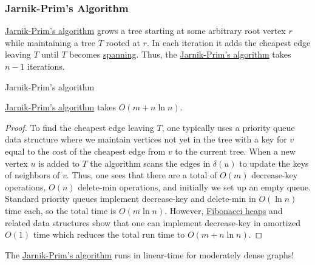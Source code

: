 \subsubsection{Jarnik-Prim's Algorithm}
\hyperref[algo:Jarnik-Prim]{Jarnik-Prim's algorithm} grows a tree starting at some arbitrary root vertex \(r\) while maintaining a tree \(T\) rooted at \(r\). In each iteration it adds the cheapest edge leaving \(T\) until \(T\) becomes \hyperref[def:spanning-tree]{spanning}. Thus, the \hyperref[algo:Jarnik-Prim]{Jarnik-Prim's algorithm} takes \(n-1\) iterations.

\begin{algorithm}[H]\label{algo:Jarnik-Prim}
	\DontPrintSemicolon
	\caption{Jarnik-Prim's algorithm}
	\BlankLine

\end{algorithm}

\begin{lemma}\label{lma:Jarnik-Prim}
	\hyperref[algo:Jarnik-Prim]{Jarnik-Prim's algorithm} takes \(O(m + n \ln n)\).
\end{lemma}
\begin{proof}
	To find the cheapest edge leaving \(T\), one typically uses a priority queue data structure where we maintain vertices not yet in the tree with a key for \(v\) equal to the cost of the cheapest edge from \(v\) to the current tree. When a new vertex \(u\) is added to \(T\) the algorithm scans the edges in \(\delta (u)\) to update the keys of neighbors of \(v\). Thus, one sees that there are a total of \(O(m)\) decrease-key operations, \(O(n)\) delete-min operations, and initially we set up an empty queue. Standard priority queues implement decrease-key and delete-min in \(O(\ln n)\) time each, so the total time is \(O(m \ln n)\). However, \href{https://en.wikipedia.org/wiki/Fibonacci_heap}{Fibonacci heaps} and related data structures show that one can implement decrease-key in amortized \(O(1)\) time which reduces the total run time to \(O(m + n \ln n)\).
\end{proof}

\begin{remark}
	The \hyperref[algo:Jarnik-Prim]{Jarnik-Prim's algorithm} runs in linear-time for moderately dense graphs!
\end{remark}

